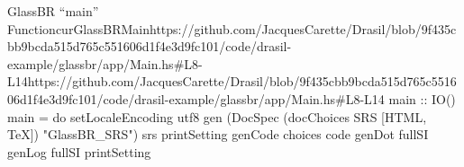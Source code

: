 \begin{haskell}{GlassBR ``main'' Function}{curGlassBRMain}{https://github.com/JacquesCarette/Drasil/blob/9f435cbb9bcda515d765c551606d1f4e3d9fc\newline{}101/code/drasil-example/glassbr/app/Main.hs\#L8-L14}{https://github.com/JacquesCarette/Drasil/blob/9f435cbb9bcda515d765c551606d1f4e3d9fc101/code/drasil-example/glassbr/app/Main.hs\#L8-L14}
main :: IO()
main = do
  setLocaleEncoding utf8
  gen (DocSpec (docChoices SRS [HTML, TeX]) "GlassBR_SRS") srs printSetting
  genCode choices code
  genDot fullSI
  genLog fullSI printSetting
\end{haskell}
